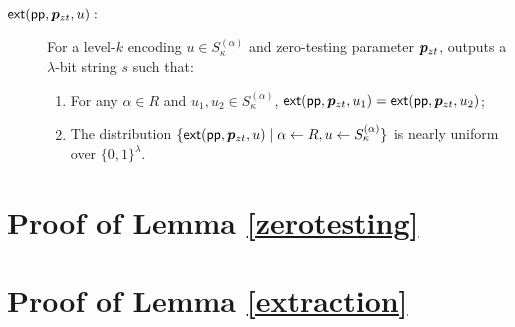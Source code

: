 \begin{definition}
\begin{description}
\item[$\mathsf{ext}(\mathsf{pp}, \bm{p}_{zt}, u):$]  For a level-$k$ encoding $u \in S_\kappa^{(\alpha)}$ and zero-testing parameter $\bm{p}_{zt}$, outputs a $\lambda$-bit string $s$ such that:
\begin{enumerate}
\item For any $\alpha \in R$ and $u_1, u_2 \in S_\kappa^{(\alpha)}$, $\mathsf{ext}(\mathsf{pp}, \bm{p}_{zt}, u_1) = \mathsf{ext}(\mathsf{pp}, \bm{p}_{zt}, u_2)$;
\item The distribution $\{\mathsf{ext}(\mathsf{pp}, \bm{p}_{zt}, u) \mid \alpha \leftarrow R, u \leftarrow S_\kappa^{(\alpha)}\}$ is nearly uniform over $\{0,1\}^\lambda$.
\end{enumerate}
\end{description}
\end{definition}

\section{Proof of Lemma \ref{zerotesting}}

\section{Proof of Lemma \ref{extraction}}
